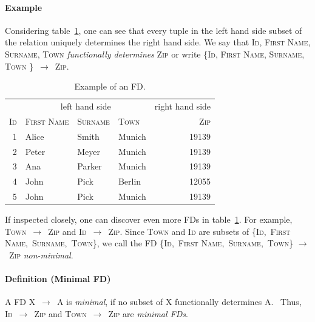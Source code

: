 \paragraph{Example} Considering table~\ref{tab:fd-example}, one can see that every tuple in the left hand side subset of the relation uniquely determines the right hand side.
We say that \textsc{Id}, \textsc{First Name}, \textsc{Surname}, \textsc{Town} \emph{functionally determines} \textsc{Zip} or write \{\textsc{Id}, \textsc{First Name}, \textsc{Surname}, \textsc{Town} \}~\( \rightarrow \)~\textsc{Zip}.~\cite[p.~43]{MAI83}

\begin{table}[ht]
    \centering
    \begin{tabular}{rlllr}
        \toprule
        \toprule
        & \multicolumn{3}{c}{left hand side} & \multicolumn{1}{c}{right hand side} \\ \cmidrule(lr{.25em}){1-4} \cmidrule(l{4.75em}){4-5}
        \textsc{Id} & \textsc{First Name} & \textsc{Surname} & \textsc{Town} & \textsc{Zip} \\
        \midrule
        1 & Alice & Smith & Munich & 19139 \\
        2 & Peter& Meyer & Munich & 19139 \\
        3 & Ana & Parker & Munich & 19139  \\
        4 & John & Pick & Berlin & 12055 \\
        5 & John & Pick & Munich & 19139 \\
        \bottomrule
        \bottomrule
    \end{tabular}
    \caption{Example of an FD.}\label{tab:fd-example}
\end{table}

If inspected closely, one can discover even more FDs in table~\ref{tab:fd-example}.
For example, \textsc{Town}~\( \rightarrow \)~\textsc{Zip} and \textsc{Id}~\( \rightarrow \)~\textsc{Zip}.
Since \textsc{Town} and \textsc{Id} are subsets of \{\textsc{Id},~\textsc{First Name},~\textsc{Surname},~\textsc{Town}\}, we call the FD \{\textsc{Id},~\textsc{First Name},~\textsc{Surname},~\textsc{Town}\} \( \rightarrow \)~\textsc{Zip} \emph{non-minimal}.

\paragraph{Definition (Minimal FD)} A FD X~\( \rightarrow \)~A is \emph{minimal}, if no subset of X functionally determines A.~\cite[p.~2]{PAP15}
Thus, \textsc{Id}~\( \rightarrow \)~\textsc{Zip} and \textsc{Town}~\( \rightarrow \)~\textsc{Zip} are \emph{minimal FDs}.

